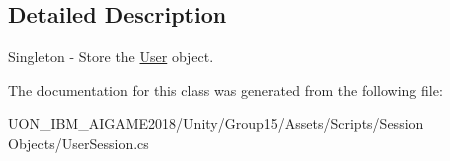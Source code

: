 \subsection{Detailed Description}
Singleton -\/ Store the \mbox{\hyperlink{class_user}{User}} object. 

The documentation for this class was generated from the following file\+:\begin{DoxyCompactItemize}
\item 
U\+O\+N\+\_\+\+I\+B\+M\+\_\+\+A\+I\+G\+A\+M\+E2018/\+Unity/\+Group15/\+Assets/\+Scripts/\+Session Objects/User\+Session.\+cs\end{DoxyCompactItemize}
